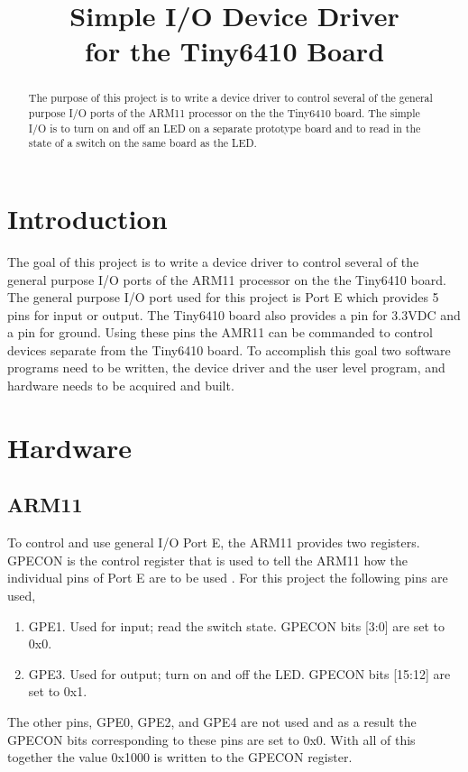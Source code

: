 \documentclass[12pt,conference]{IEEEtran}
\begin{document}
\title{Simple I/O Device Driver\\
	   for the Tiny6410 Board}

\author
{
}

\maketitle

\begin{abstract}
The purpose of this project is to write a device driver to control several of the general purpose I/O ports of the ARM11 processor on the the Tiny6410 board. The simple I/O is to turn on and off an LED on a separate prototype board and to read in the state of a switch on the same board as the LED.
\end{abstract}

\section{Introduction}
The goal of this project is to write a device driver to control several of the general purpose I/O ports of the ARM11 processor on the the Tiny6410 board. The general purpose I/O port used for this project is Port E which provides 5 pins for input or output. The Tiny6410 board also provides a pin for 3.3VDC and a pin for ground. Using these pins the AMR11 can be commanded to control devices separate from the Tiny6410 board. To accomplish this goal two software programs need to be written, the device driver and the user level program, and hardware needs to be acquired and built.

\section{Hardware}
\subsection{ARM11}\label{ARM11HW}
To control and use general I/O Port E, the ARM11 provides two registers. GPECON is the control register that is used to tell the ARM11 how the individual pins of Port E are to be used \cite{Samsung}. For this project the following pins are used,
\begin{enumerate}
	\item GPE1. Used for input; read the switch state. GPECON bits [3:0] are set to 0x0.
	\item GPE3. Used for output; turn on and off the LED. GPECON bits [15:12] are set to 0x1.
\end{enumerate}
The other pins, GPE0, GPE2, and GPE4 are not used and as a result the GPECON bits corresponding to these pins are set to 0x0. With all of this together the value 0x1000 is written to the GPECON register.
\end{document}
